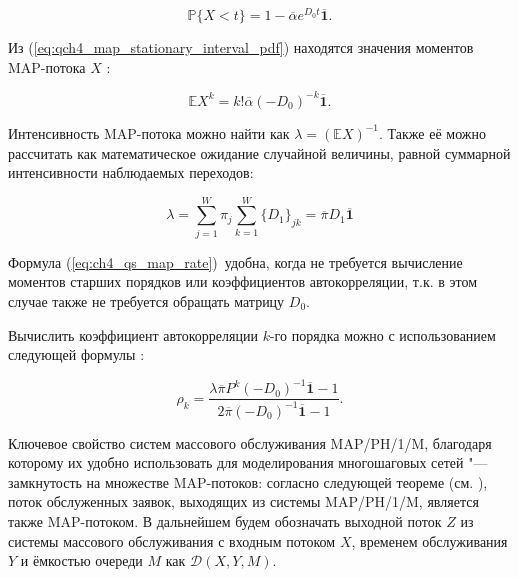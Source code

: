 \begin{equation}
	\label{eq:ch4_map_stationary_interval_pdf}
	\mathbb{P}\{X < t\} = 1 - \overline{\alpha}e^{D_0 t}\overline{\mathbf{1}}.
\end{equation}

Из (\ref{eq:qch4_map_stationary_interval_pdf}) находятся значения моментов MAP-потока $X$ \cite{Horvath2005}:

\begin{equation}
	\label{eq:ch4_map_moments}
	\mathbb{E}X^{k} = k! \overline{\alpha}(-D_0)^{-k}\overline{\mathbf{1}}.
\end{equation}

Интенсивность MAP-потока можно найти как $\lambda = (\mathbb{E}X)^{-1}$. Также её можно рассчитать как математическое ожидание случайной величины, равной суммарной интенсивности наблюдаемых переходов:

\begin{equation}
	\label{eq:ch4_qs_map_rate}
	\lambda = \sum\limits_{j=1}^{W} \pi_j \sum\limits_{k=1}^{W} \{D_1\}_{jk} = \overline{\pi} D_1 \overline{\mathbf{1}}
\end{equation}

Формула (\ref{eq:ch4_qs_map_rate})~удобна, когда не требуется вычисление моментов старших порядков или коэффициентов автокорреляции, т.к. в этом случае также не требуется обращать матрицу $D_0$.

Вычислить коэффициент автокорреляции $k$-го порядка можно с использованием следующей формулы \cite{Horvath2005}:

\begin{equation}
	\label{eq:ch4_map_lag_k}
	\rho_k = \frac{\lambda \overline{\pi} P^k (-D_0)^{-1} \overline{\mathbf{1}} - 1}{2 \overline{\pi} (-D_0)^{-1} \overline{\mathbf{1}} - 1}.
\end{equation}




Ключевое свойство систем массового обслуживания MAP/PH/1/M, благодаря которому их удобно использовать для моделирования многошаговых сетей "--- замкнутость на множестве MAP-потоков: согласно следующей теореме (см. \cite{VishnevskyDudin2018}), поток обслуженных заявок, выходящих из системы MAP/PH/1/M, является также MAP-потоком. В дальнейшем будем обозначать выходной поток $Z$ из системы массового обслуживания с входным потоком $X$, временем обслуживания $Y$ и ёмкостью очереди $M$ как $\mathcal{D}(X, Y, M)$.

